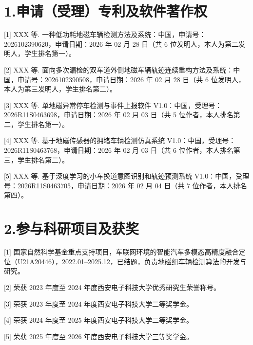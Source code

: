 
\section*{1.\quad 申请（受理）专利及软件著作权}

[1] XXX 等. 一种低功耗地磁车辆检测方法及系统：中国，申请号：2026102390620，申请日期：2026 年 02 月 28 日（共 6 位发明人，本人为第二发明人，学生排名第一）。

[2] XXX 等. 面向多次漏检的双车道外侧地磁车辆轨迹连续重构方法及系统：中国，申请号：2026102390508，申请日期：2026 年 02 月 28 日（共 6 位发明人，本人为第三发明人，学生排名第二）。

[3] XXX 等. 单地磁异常停车检测与事件上报软件 V1.0：中国，受理号：2026R11S0463698，申请日期：2026 年 02 月 03 日（共 5 位作者，本人排名第二，学生排名第一）。

[4] XXX 等. 基于地磁传感器的拥堵车辆检测仿真系统 V1.0：中国，受理号：2026R11S0463768，申请日期：2026 年 02 月 03 日（共 6 位作者，本人排名第三，学生排名第二）。

[5] XXX 等. 基于深度学习的小车换道意图识别和轨迹预测系统 V1.0：中国，受理号：2026R11S0463705，申请日期：2026 年 02 月 04 日（共 7 位作者，本人排名第四）。

\section*{2.\quad 参与科研项目及获奖}

[1] 国家自然科学基金重点支持项目，车联网环境的智能汽车多模态高精度融合定位（U21A20446），2022.01--2025.12，已结题，负责地磁组车辆检测算法的开发与研究。

[2] 荣获 2023 年度至 2024 年度西安电子科技大学优秀研究生荣誉称号。

[3] 荣获 2023 年度至 2024 年度西安电子科技大学二等奖学金。

[4] 荣获 2024 年度至 2025 年度西安电子科技大学二等奖学金。

[5] 荣获 2025 年度至 2026 年度西安电子科技大学三等奖学金。
